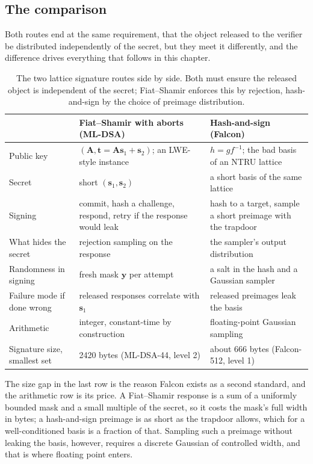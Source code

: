 \subsection{The comparison}

Both routes end at the same requirement, that the object released to the verifier be distributed independently of the secret, but they meet it differently, and the difference drives everything that follows in this chapter.

\begin{table}[H]
\centering
\small
\begin{tabular}{p{}p{}p{}}
\toprule
 & Fiat--Shamir with aborts (ML-DSA) & Hash-and-sign (Falcon) \\
\midrule
Public key & $(\mathbf{A}, \mathbf{t} = \mathbf{A}\mathbf{s}_1 + \mathbf{s}_2)$; an LWE-style instance & $h = g f^{-1}$; the bad basis of an NTRU lattice \\
Secret & short $(\mathbf{s}_1, \mathbf{s}_2)$ & a short basis of the same lattice \\
Signing & commit, hash a challenge, respond, retry if the response would leak & hash to a target, sample a short preimage with the trapdoor \\
What hides the secret & rejection sampling on the response & the sampler's output distribution \\
Randomness in signing & fresh mask $\mathbf{y}$ per attempt & a salt in the hash and a Gaussian sampler \\
Failure mode if done wrong & released responses correlate with $\mathbf{s}_1$ & released preimages leak the basis \\
Arithmetic & integer, constant-time by construction & floating-point Gaussian sampling \\
Signature size, smallest set & 2420 bytes (ML-DSA-44, level 2) & about 666 bytes (Falcon-512, level 1) \\
\bottomrule
\end{tabular}
\caption{The two lattice signature routes side by side. Both must ensure the released object is independent of the secret; Fiat--Shamir enforces this by rejection, hash-and-sign by the choice of preimage distribution.}
\label{tab:hash-and-sign-vs-fs}
\end{table}

The size gap in the last row is the reason Falcon exists as a second standard, and the arithmetic row is its price. A Fiat--Shamir response is a sum of a uniformly bounded mask and a small multiple of the secret, so it costs the mask's full width in bytes; a hash-and-sign preimage is as short as the trapdoor allows, which for a well-conditioned basis is a fraction of that. Sampling such a preimage without leaking the basis, however, requires a discrete Gaussian of controlled width, and that is where floating point enters.

